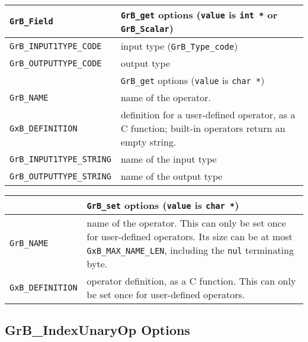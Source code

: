 \noindent
{\small
\begin{tabular}{p{2.2in}p{3.5in}}
\hline
\hline
\verb'GrB_Field'                    & \verb'GrB_get' options (\verb'value' is \verb'int *' or \verb'GrB_Scalar') \\
\hline
\verb'GrB_INPUT1TYPE_CODE'          & input type (\verb'GrB_Type_code') \\
\verb'GrB_OUTPUTTYPE_CODE'          & output type \\
\hline
\hline
                                    & \verb'GrB_get' options (\verb'value' is \verb'char *') \\
\hline
\verb'GrB_NAME'                     & name of the operator. \\
\verb'GxB_DEFINITION'               & definition for a user-defined operator, as a C function; built-in operators
                                        return an empty string. \\
\verb'GrB_INPUT1TYPE_STRING'        & name of the input type \\
\verb'GrB_OUTPUTTYPE_STRING'        & name of the output type \\
\hline
\end{tabular}
}

\noindent
{\small
\begin{tabular}{p{2.2in}p{3.5in}}
\hline
                                    & \verb'GrB_set' options (\verb'value' is \verb'char *') \\
\hline
\verb'GrB_NAME'                     & name of the operator.  This can only be set once for user-defined operators.
                                        Its size can be at most \verb'GxB_MAX_NAME_LEN', including the
                                        \verb'nul' terminating byte. \\
\verb'GxB_DEFINITION'               & operator definition, as a C function.  This can only be
                                        set once for user-defined operators. \\
\hline
\end{tabular}
}

\newpage
\subsection{{\sf GrB\_IndexUnaryOp} Options}
\label{get_set_idxunop}

